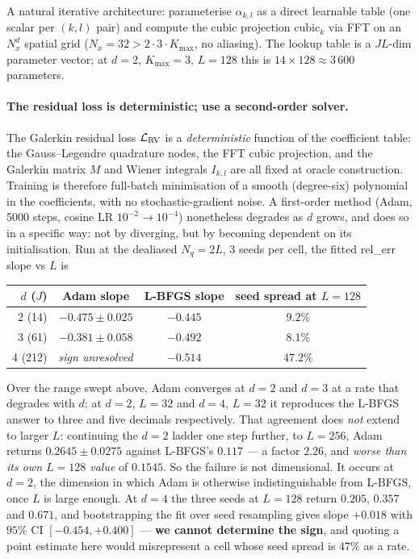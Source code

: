 A natural iterative architecture: parameterise $\alpha_{k, l}$ as a
direct learnable table (one scalar per $(k, l)$ pair) and compute the
cubic projection $\mathrm{cubic}_k$ via FFT on an
$N_x^d$ spatial grid ($N_x = 32 > 2 \cdot 3 \cdot K_{\max}$, no
aliasing). The lookup table is a $JL$-dim parameter vector; at $d = 2$,
$K_{\max} = 3$, $L = 128$ this is $14 \times 128 \approx 3\,600$
parameters.

\paragraph{The residual loss is deterministic; use a second-order solver.}
The Galerkin residual loss $\mathcal{L}_{\rm RV}$ is a \emph{deterministic}
function of the coefficient table: the Gauss--Legendre quadrature nodes,
the FFT cubic projection, and the Galerkin matrix $M$ and Wiener
integrals $I_{k, l}$ are all fixed at oracle construction. Training is
therefore full-batch minimisation of a smooth (degree-six) polynomial in
the coefficients, with no stochastic-gradient noise. A first-order method
(Adam, 5000 steps, cosine LR $10^{-2} \to 10^{-4}$) nonetheless degrades
as $d$ grows, and does so in a specific way: not by diverging, but by
becoming dependent on its initialisation. Run at the dealiased $N_q = 2L$,
3 seeds per cell, the fitted rel\_err slope vs $L$ is

\begin{center}\small
\begin{tabular}{rccc}
\toprule
$d$ ($J$) & Adam slope & L-BFGS slope & seed spread at $L = 128$ \\
\midrule
2 (14)  & $-0.475 \pm 0.025$ & $-0.445$ & $9.2\%$ \\
3 (61)  & $-0.381 \pm 0.058$ & $-0.492$ & $8.1\%$ \\
4 (212) & \emph{sign unresolved} & $-0.514$ & $\mathbf{47.2\%}$ \\
\bottomrule
\end{tabular}
\end{center}

\noindent Over the range swept above, Adam converges at $d = 2$ and
$d = 3$ at a rate that degrades with $d$; at $d = 2$, $L = 32$ and
$d = 4$, $L = 32$ it reproduces the L-BFGS answer to three and five
decimals respectively. That agreement does \emph{not} extend to larger
$L$: continuing the $d = 2$ ladder one step further, to $L = 256$, Adam
returns $0.2645 \pm 0.0275$ against L-BFGS's $0.117$ --- a factor $2.26$,
and \emph{worse than its own $L = 128$ value} of $0.1545$. So the
failure is not dimensional. It occurs at $d = 2$, the dimension in which
Adam is otherwise indistinguishable from L-BFGS, once $L$ is large
enough. At $d = 4$ the
three seeds at $L = 128$ return $0.205$, $0.357$ and $0.671$, and
bootstrapping the fit over seed resampling gives slope $+0.018$ with
$95\%$ CI $[-0.454, +0.400]$ --- \textbf{we cannot determine the sign},
and quoting a point estimate here would misrepresent a cell whose
seed spread is $47\%$ as a rate.

